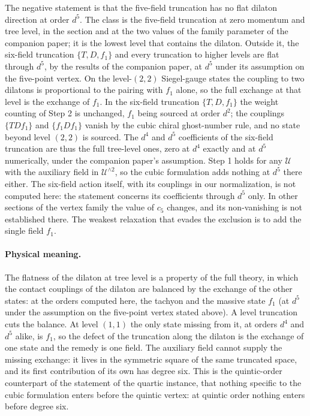 The negative statement is that the five-field truncation has no flat dilaton direction at order $d^5$.
The class is the five-field truncation at zero momentum and tree level, in the section and at the two values of the family parameter of the companion paper; it is the lowest level that contains the dilaton.
Outside it, the six-field truncation $\{T, D, f_1\}$ and every truncation to higher levels are flat through $d^5$, by the results of the companion paper, at $d^5$ under its assumption on the five-point vertex.
On the level-$(2, 2)$ Siegel-gauge states the coupling to two dilatons is proportional to the pairing with $f_1$ alone, so the full exchange at that level is the exchange of $f_1$.
In the six-field truncation $\{T, D, f_1\}$ the weight counting of Step 2 is unchanged, $f_1$ being sourced at order $d^2$; the couplings $\{T D f_1\}$ and $\{f_1 D f_1\}$ vanish by the cubic chiral ghost-number rule, and no state beyond level $(2, 2)$ is sourced.
The $d^4$ and $d^5$ coefficients of the six-field truncation are thus the full tree-level ones, zero at $d^4$ exactly and at $d^5$ numerically, under the companion paper's assumption.
Step 1 holds for any $\mathcal U$ with the auxiliary field in $\mathcal U^{\wedge 2}$, so the cubic formulation adds nothing at $d^5$ there either.
The six-field action itself, with its couplings in our normalization, is not computed here: the statement concerns its coefficients through $d^5$ only.
In other sections of the vertex family the value of $c_5$ changes, and its non-vanishing is not established there.
The weakest relaxation that evades the exclusion is to add the single field $f_1$.

\paragraph{Physical meaning.}

The flatness of the dilaton at tree level is a property of the full theory, in which the contact couplings of the dilaton are balanced by the exchange of the other states: at the orders computed here, the tachyon and the massive state $f_1$ (at $d^5$ under the assumption on the five-point vertex stated above).
A level truncation cuts the balance.
At level $(1, 1)$ the only state missing from it, at orders $d^4$ and $d^5$ alike, is $f_1$, so the defect of the truncation along the dilaton is the exchange of one state and the remedy is one field.
The auxiliary field cannot supply the missing exchange: it lives in the symmetric square of the same truncated space, and its first contribution of its own has degree six.
This is the quintic-order counterpart of the statement of the quartic instance, that nothing specific to the cubic formulation enters before the quintic vertex: at quintic order nothing enters before degree six.

